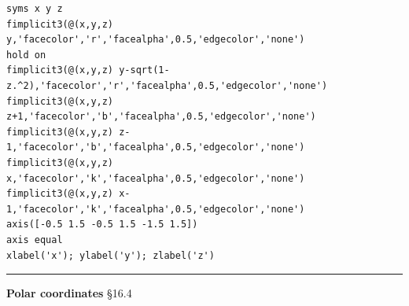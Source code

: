 \documentclass[12pt,letterpaper,noanswers]{exam}
\begin{document}
\begin{lstlisting}
syms x y z
fimplicit3(@(x,y,z) y,'facecolor','r','facealpha',0.5,'edgecolor','none')
hold on
fimplicit3(@(x,y,z) y-sqrt(1-z.^2),'facecolor','r','facealpha',0.5,'edgecolor','none')
fimplicit3(@(x,y,z) z+1,'facecolor','b','facealpha',0.5,'edgecolor','none')
fimplicit3(@(x,y,z) z-1,'facecolor','b','facealpha',0.5,'edgecolor','none')
fimplicit3(@(x,y,z) x,'facecolor','k','facealpha',0.5,'edgecolor','none')
fimplicit3(@(x,y,z) x-1,'facecolor','k','facealpha',0.5,'edgecolor','none')
axis([-0.5 1.5 -0.5 1.5 -1.5 1.5])
axis equal
xlabel('x'); ylabel('y'); zlabel('z')
\end{lstlisting}

\eject
\vspace{0.2cm}
\hrule
\vspace{0.2cm}

\noindent\textbf{Polar coordinates} \S 16.4
\end{document}
